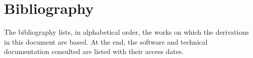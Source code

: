 \chapter*{Bibliography}
\label{app:bibliografia}

The bibliography lists, in alphabetical order, the works on which the derivations in this document are based. At the
end, the software and technical documentation consulted are listed with their access dates.

\begingroup
\small
\raggedright
\renewcommand{\chapter}[2]{}
